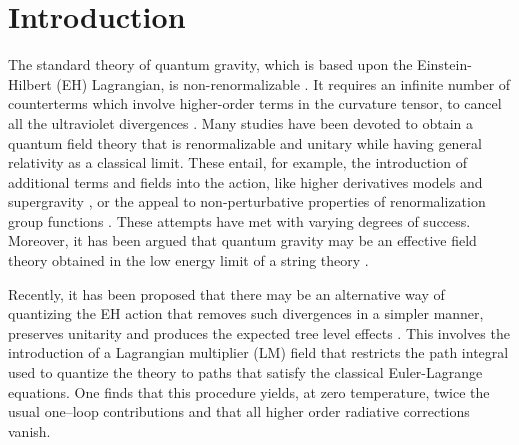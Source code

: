 \documentclass[longbibliography,groupedaddress,showpacs,showkeys,amssymb,eqsecnum,aps,nofootinbib,superscriptaddress]{revtex4}
\begin{document}

\maketitle

\section{Introduction}
The standard theory of quantum gravity, which is based upon the
Einstein-Hilbert (EH) Lagrangian, is non-renormalizable \cite{tHooft:1974bx,Goroff:1986th,vandeVen:1991gw}.
It requires an infinite number of counterterms which involve higher-order 
terms in the curvature tensor, to cancel all the ultraviolet
divergences \cite{Gomis:1995jp,PhysRevD.100.026018}.
Many studies have been devoted to obtain a quantum field theory that
is renormalizable and unitary while having general relativity as a
classical limit. These entail, for example, the introduction of additional
terms and fields into the action, like higher derivatives models
\cite{Mannheim:2011ds} 
and supergravity \cite{Freedman:2012zz}, or the appeal to non-perturbative
properties of  renormalization group functions \cite{Nagy:2012ef}. These
attempts have met with varying degrees of success. Moreover, it has
been argued that quantum gravity may be an effective field theory
obtained in the low energy limit of a string theory \cite{green_schwarz_witten_2012,polchinski_1998}.

Recently,  it has been proposed 
that there may be an
alternative way of quantizing the EH action that removes such
divergences in a simpler manner,  preserves unitarity and produces the 
expected tree level effects 
\cite{McKeon:1992rq,PhysRevD.100.125014,Brandt:2018lbe,McKeon:2020pkm,Brandt:2021ycu}.
This involves the introduction of a
Lagrangian multiplier (LM) field that restricts the path integral used 
to quantize the theory to paths that satisfy the classical
Euler-Lagrange equations. One finds that this procedure yields,  at
zero temperature,  twice the usual one--loop contributions and that 
all higher order radiative corrections vanish. 
\end{document}
